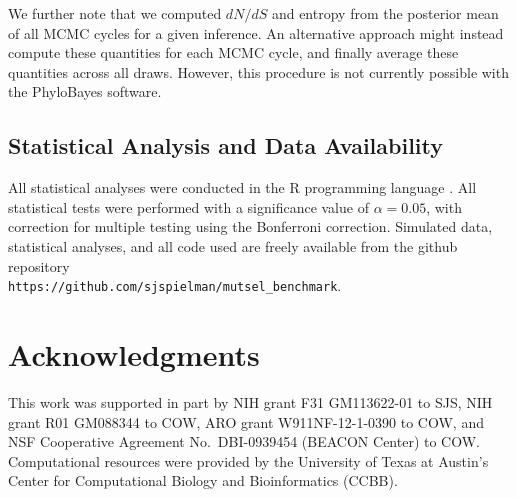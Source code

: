 \documentclass[11pt]{article}
\begin{document}
We further note that we computed $dN/dS$ and entropy from the posterior mean of all MCMC cycles for a given inference. An alternative approach might instead compute these quantities for each MCMC cycle, and finally average these quantities across all draws. However, this procedure is not currently possible with the PhyloBayes software. %


\subsection*{Statistical Analysis and Data Availability}
All statistical analyses were conducted in the R programming language \citep{R}. All statistical tests were performed with a significance value of $\alpha=0.05$, with correction for multiple testing using the Bonferroni correction. Simulated data, statistical analyses, and all code used are freely available from the github repository \\ \texttt{https://github.com/sjspielman/mutsel\_benchmark}.


\section*{Acknowledgments}
This work was supported in part by NIH grant F31 GM113622-01 to SJS, NIH grant R01 GM088344 to COW, ARO grant W911NF-12-1-0390 to COW, and NSF Cooperative Agreement No.\ DBI-0939454 (BEACON Center) to COW. Computational resources were provided by the University of Texas at Austin's Center for Computational Biology and Bioinformatics (CCBB).
\end{document}
